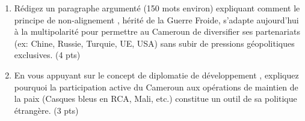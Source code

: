 \documentclass[11pt]{article}
\begin{document}
\begin{exercice}
\begin{enumerate}
    \item Rédigez un paragraphe argumenté (150 mots environ) expliquant comment le principe de \og non-alignement \fg{}, hérité de la Guerre Froide, s'adapte aujourd'hui à la multipolarité pour permettre au Cameroun de diversifier ses partenariats (ex: Chine, Russie, Turquie, UE, USA) sans subir de pressions géopolitiques exclusives. (4 pts)
    \item En vous appuyant sur le concept de \og diplomatie de développement \fg{}, expliquez pourquoi la participation active du Cameroun aux opérations de maintien de la paix (Casques bleus en RCA, Mali, etc.) constitue un outil de sa politique étrangère. (3 pts)
\end{enumerate}
\end{exercice}
\end{document}

